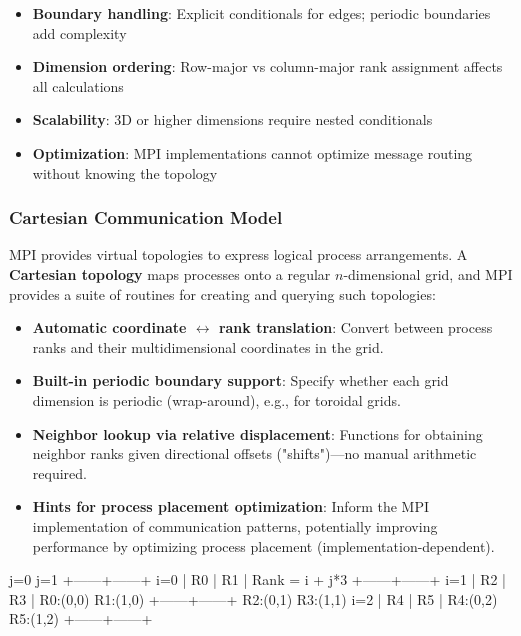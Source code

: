 \begin{itemize}
    \item \textbf{Boundary handling}: Explicit conditionals for edges; periodic boundaries add complexity
    \item \textbf{Dimension ordering}: Row-major vs column-major rank assignment affects all calculations
    \item \textbf{Scalability}: 3D or higher dimensions require nested conditionals
    \item \textbf{Optimization}: MPI implementations cannot optimize message routing without knowing the topology
\end{itemize}

\subsubsection{Cartesian Communication Model}

MPI provides virtual topologies to express logical process arrangements. A \textbf{Cartesian topology} maps processes onto a regular $n$-dimensional grid, and MPI provides a suite of routines for creating and querying such topologies:

\begin{itemize}
    \item \textbf{Automatic coordinate $\leftrightarrow$ rank translation}: Convert between process ranks and their multidimensional coordinates in the grid.
    \item \textbf{Built-in periodic boundary support}: Specify whether each grid dimension is periodic (wrap-around), e.g., for toroidal grids.
    \item \textbf{Neighbor lookup via relative displacement}: Functions for obtaining neighbor ranks given directional offsets ("shifts")—no manual arithmetic required.
    \item \textbf{Hints for process placement optimization}: Inform the MPI implementation of communication patterns, potentially improving performance by optimizing process placement (implementation-dependent).
\end{itemize}

\begin{exampleblock}

\begin{codeblock}[language=C, numbers=none]
        j=0    j=1
      +------+------+  
i=0   |  R0  |  R1  |   Rank = i + j*3
      +------+------+  
i=1   |  R2  |  R3  |   R0:(0,0) R1:(1,0)
      +------+------+   R2:(0,1) R3:(1,1)
i=2   |  R4  |  R5  |   R4:(0,2) R5:(1,2)
      +------+------+  
\end{codeblock}
\end{exampleblock}

